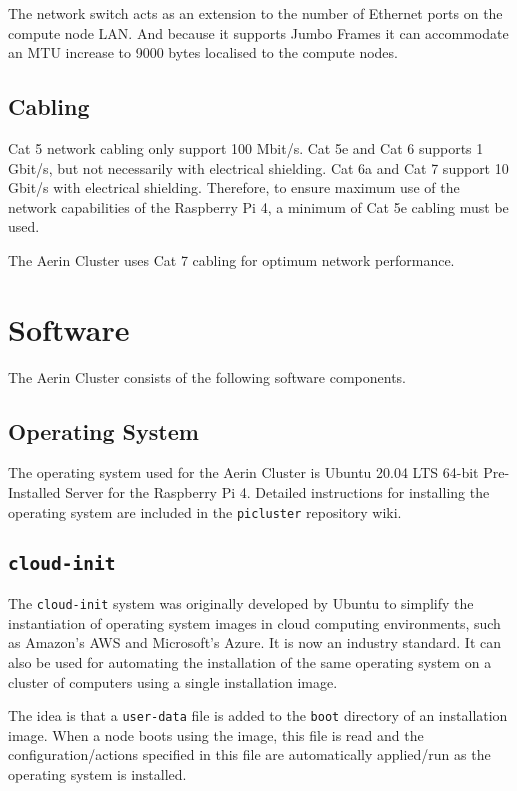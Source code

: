 The network switch acts as an extension to the number of Ethernet ports on the compute node LAN. And because it supports Jumbo Frames it can accommodate an MTU increase to 9000 bytes localised to the compute nodes.


%
%
\subsection{Cabling}
Cat 5 network cabling only support 100 Mbit/s. Cat 5e and Cat 6 supports 1 Gbit/s, but not necessarily with electrical shielding. Cat 6a and Cat 7 support 10 Gbit/s with electrical shielding. Therefore, to ensure maximum use of the network capabilities of the Raspberry Pi 4, a minimum of Cat 5e cabling must be used.

The Aerin Cluster uses Cat 7 cabling for optimum network performance.


%
%
\section{Software}

The Aerin Cluster consists of the following software components.


%
%
\subsection{Operating System}
The operating system used for the Aerin Cluster is Ubuntu 20.04 LTS 64-bit Pre-Installed Server for the Raspberry Pi 4. Detailed instructions for installing the operating system are included in the \verb|picluster| repository wiki.


%
%
\subsection{\texttt{cloud-init}}

The \verb|cloud-init| system was originally developed by Ubuntu to simplify the instantiation of operating system images in cloud computing environments, such as Amazon's AWS and Microsoft's Azure. It is now an industry standard. It can also be used for automating the installation of the same operating system on a cluster of computers using a single installation image.

The idea is that a \verb|user-data| file is added to the \verb|boot| directory of an installation image. When a node boots using the image, this file is read and the configuration/actions specified in this file are automatically applied/run as the operating system is installed.


